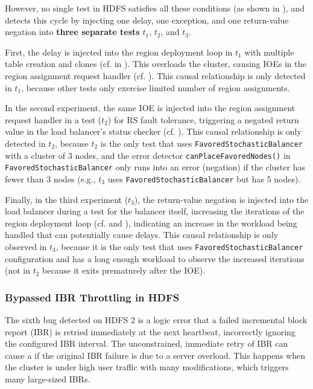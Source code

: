 However, no single test in HDFS satisfies 
all these conditions (as shown in ), 
and 
\tool detects this cycle by injecting one delay, one exception, and one return-value negation into 
\textbf{three separate tests} $t_1$, $t_2$, and $t_3$. 

First, the delay is injected into the region deployment loop in 
$t_1$
with multiple table creation and clones (cf.  in ). This overloads the cluster, causing IOEs in the region assignment request handler (cf. ). 
This causal relationship is only detected in 
$t_1$, 
because other tests only exercise limited number of region assignments. 

In the second experiment, 
the same IOE is injected into the region assignment request handler 
in a test ($t_2$) for RS fault tolerance, 
triggering a negated return value in the load balancer's status checker (cf. ). 
This causal relationship is only detected 
in $t_2$, 
because $t_2$ is the only test that 
uses 
\texttt{Favored\-Stochastic\-Balancer} 
with a cluster of 3 nodes, 
and 
the error detector \texttt{canPlaceFavoredNodes()} 
in \texttt{Favored\-Stochastic\-Balancer} 
only runs into an error (negation) 
if the cluster has fewer than 3 nodes 
(e.g., $t_3$ uses \texttt{Favored\-Stochastic\-Balancer} but has 5 nodes). 


Finally, in the third experiment ($t_3$), the return-value negation is injected into the load balancer during a test for the balancer itself, increasing the iterations of the region deployment loop (cf.  and ), indicating an increase in the workload being handled that can potentially cause delays. 
This causal relationship is only observed in 
$t_3$, 
because 
it is the only test that uses 
\texttt{Favored\-Stochastic\-Balancer} configuration 
and has a long enough workload to observe the increased iterations 
(not in $t_2$ because it exits prematurely after the IOE). 

\subsubsection{Bypassed IBR Throttling in HDFS}

The sixth bug detected on HDFS 2 is a logic error that a failed 
incremental block report (IBR) is retried immediately at the next heartbeat, 
incorrectly ignoring the configured IBR interval. 
The unconstrained, immediate retry of IBR 
can cause a \vc if the original IBR failure is 
due to a server overload. 
This happens when the cluster 
is under high user traffic with many modifications, 
which triggers many large-sized IBRs.

